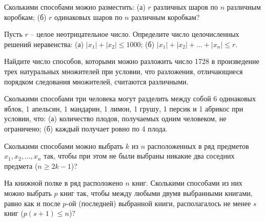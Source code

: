 \begin{problemList}
\problemItemSimple
{}
{Сколькими способами можно разместить: (а) $r$ различных шаров по $n$
различным коробкам; (б) $r$ одинаковых шаров по $n$ различным
коробкам?}

\problemItemSimple
{}
{Пусть $r$ -- целое неотрицательное число. Определите число
целочисленных решений неравенства: (а) $|x_1| + |x_2| \le 1000$;
(б) $|x_1| + |x_2| + \ldots + |x_n| \le r$.}

\problemItemSimple
{}
{Найдите число способов, которыми можно разложить число 1728 в
произведение трех натуральных множителей при условии, что разложения,
отличающиеся порядком следования множителей, считаются различными.}

\problemItemSimple
{}
{Сколькими способами три человека могут разделить между собой 6
одинаковых яблок, 1 апельсин, 1 мандарин, 1 лимон, 1 грушу, 1 персик
и 1 абрикос при условии, что: (а) количество плодов, получаемых одним
человеком, не ограничено; (б) каждый получает ровно по 4 плода.}

\problemItemSimple
{}
{Сколькими способами можно выбрать $k$ из $n$ расположенных в ряд
предметов $x_1, x_2, \dots, x_n$ так, чтобы при этом не были выбраны
никакие два соседних предмета ($n \ge 2k - 1$)?}

\problemItemSimple
{}
{На книжной полке в ряд расположено $n$ книг. Сколькими способами из
них можно выбрать $p$ книг так, чтобы между любыми двумя выбранными
книгами, равно как и после $p$-ой (последней) выбранной книги,
располагалось не менее $s$ книг ($p(s + 1) \le n$)?}

\end{problemList}


